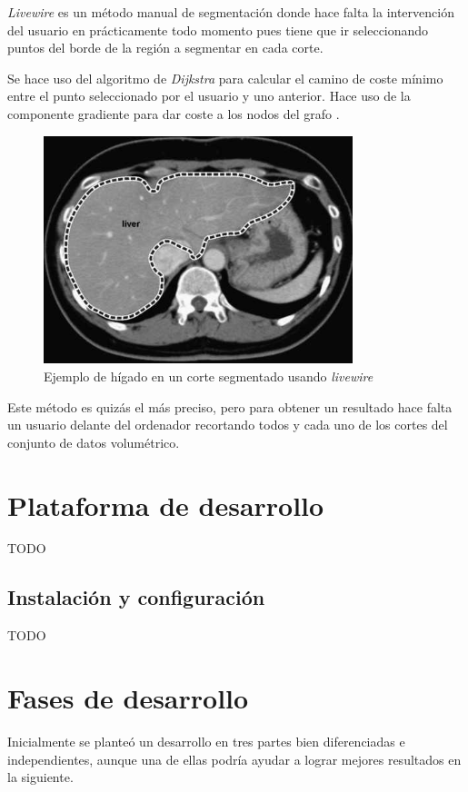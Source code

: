\textit{Livewire} es un método manual de segmentación donde hace falta la intervención del usuario en prácticamente todo momento pues tiene que ir seleccionando puntos del borde de la región a segmentar en cada corte.

Se hace uso del algoritmo de \textit{Dijkstra} para calcular el camino de coste mínimo entre el punto seleccionado por el usuario y uno anterior. Hace uso de la componente gradiente para dar coste a los nodos del grafo \cite{mortensen95}.

\begin{figure}[H]
	\centering
	\includegraphics[width=9cm]{imagenes/desarrollo/livewire}
	\caption{Ejemplo de hígado en un corte segmentado usando \textit{livewire} \cite{toennies12}}
	\label{fig:desarrollo/livewire}
\end{figure}

Este método es quizás el más preciso, pero para obtener un resultado hace falta un usuario delante del ordenador recortando todos y cada uno de los cortes del conjunto de datos volumétrico.

\section{Plataforma de desarrollo}

TODO

\subsection{Instalación y configuración}

TODO

\section{Fases de desarrollo}

Inicialmente se planteó un desarrollo en tres partes bien diferenciadas e independientes, aunque una de ellas podría ayudar a lograr mejores resultados en la siguiente. 

